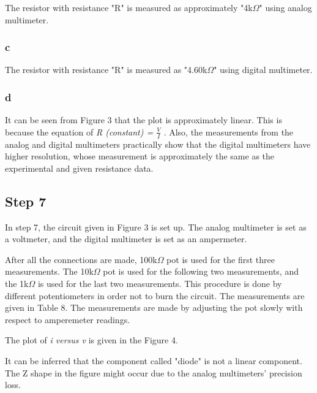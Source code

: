 \documentclass[letterpaper,12pt]{article}
\begin{document}
The resistor with resistance "R" is measured as approximately "4k\(\Omega\)" using analog multimeter.
\subsubsection{c}

The resistor with resistance "R" is measured as  "4.60k\(\Omega\)" using digital multimeter.

\subsubsection{d}
It can be seen from Figure 3 that the plot is approximately linear. This is because the equation of  \emph{ R (constant) = \(\frac{V}{I}\) } . Also, the measurements from the analog and digital multimeters practically show that the digital multimeters have higher resolution, whose measurement is approximately the same as the experimental and given resistance data.
\subsection{Step 7}
In step 7, the circuit given in Figure 3 is set up. The analog multimeter is set as a voltmeter, and the digital multimeter is set as an ampermeter.  


After all the connections are made, 100k\(\Omega\) pot is used for the first three measurements. The 10k\(\Omega\) pot is used for the following two measurements, and the 1k\(\Omega\) is used for the last two measurements. This procedure is done by different potentiometers in order not to burn the circuit. The measurements are given in Table 8. The measurements are made by adjusting the pot slowly with respect to amperemeter readings.

The plot of \emph{i versus v} is given in the Figure 4.

It can be inferred that the component called "diode" is not a linear component. The Z shape in the figure might occur due to the analog multimeters' precision loss. 
\end{document}

